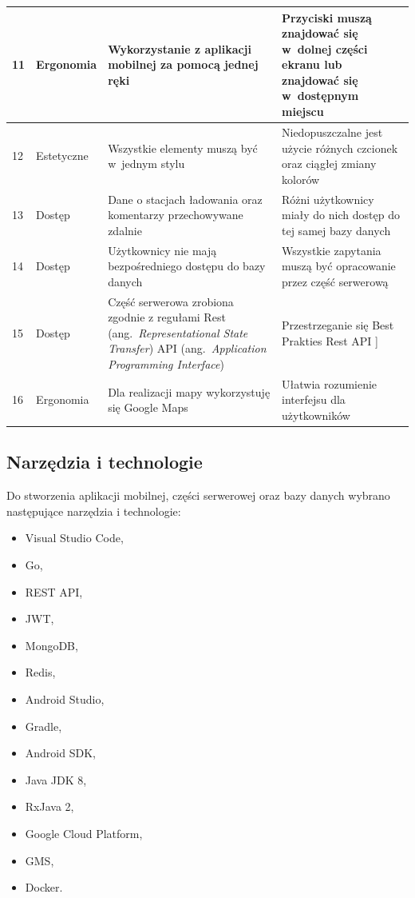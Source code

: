 \begin{table}[htb]
\begin{tabularx}{\linewidth}{| l| l |X | X |}
    \hline
    11 & Ergonomia & Wykorzystanie z aplikacji mobilnej za pomocą jednej ręki & Przyciski muszą znajdować się w~dolnej części ekranu lub znajdować się w~dostępnym miejscu \\
    \hline
    12 & Estetyczne & Wszystkie elementy muszą być w~jednym stylu & Niedopuszczalne jest użycie różnych czcionek oraz ciągłej zmiany kolorów \\
    \hline
    13 & Dostęp & Dane o stacjach ładowania oraz komentarzy przechowywane zdalnie & Różni użytkownicy miały do nich dostęp do tej samej bazy danych \\
    \hline
    14 & Dostęp & Użytkownicy nie mają bezpośredniego dostępu do bazy danych & Wszystkie zapytania muszą być opracowanie przez część serwerową \\
    \hline
    15 & Dostęp & Część serwerowa zrobiona zgodnie z regułami Rest (ang.~\emph{Representational State Transfer}) API (ang.~\emph{Application Programming Interface}) & Przestrzeganie się Best Prakties Rest API \cite{rest_api_best}] \\
    \hline
    16 & Ergonomia & Dla realizacji mapy wykorzystuję się Google Maps & Ułatwia rozumienie interfejsu dla użytkowników \\
    \hline
\end{tabularx}
\end{table}
\newpage
\subsection{Narzędzia i technologie}
Do stworzenia aplikacji mobilnej, części serwerowej oraz bazy danych wybrano następujące narzędzia i technologie:
\begin{multicols}{3}
\begin{itemize}
    \item Visual Studio Code,
    \item Go,
    \item REST API,
    \item JWT,
    \item MongoDB,
    \item Redis,
    \item Android Studio,
    \item Gradle,
    \item Android SDK,
    \item Java JDK 8,
    \item RxJava 2,
    \item Google Cloud Platform,
    \item GMS,
    \item Docker.
\end{itemize}
\end{multicols}


